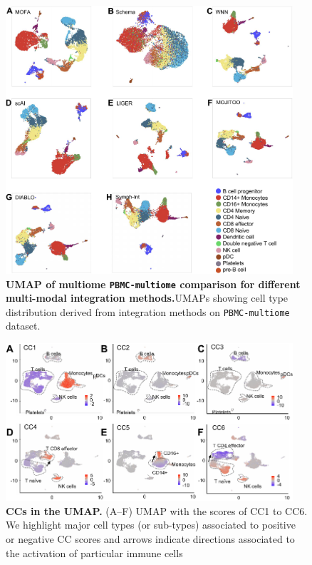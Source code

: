 \begin{figure}[!ht]
	\centering
	\includegraphics[width=0.95\textwidth]{pbmc_multiome_umap/fig}
	\vspace{0.1cm}
	\caption[UMAP of multiome PBMC comparison for different multi-modal integration methods.]{\textbf{UMAP of multiome \texttt{PBMC-multiome} comparison for different multi-modal integration methods.}UMAPs showing cell type distribution derived from integration methods on \texttt{PBMC-multiome} dataset. }
	\label{fig:pbmc_multiome_umap}
\end{figure}


\begin{figure}[!ht]
	\centering
	\includegraphics[width=0.95\textwidth]{CC_UMAP/fig}
	\vspace{0.1cm}
	\caption[CCs in the UMAP.]{\textbf{CCs in the UMAP.} (A–F) UMAP with the scores of CC1 to CC6. We highlight major cell types (or sub-types) associated to positive or negative CC scores and arrows indicate directions associated to the activation of particular immune cells}
	\label{fig:CC_UMAP}
\end{figure}


